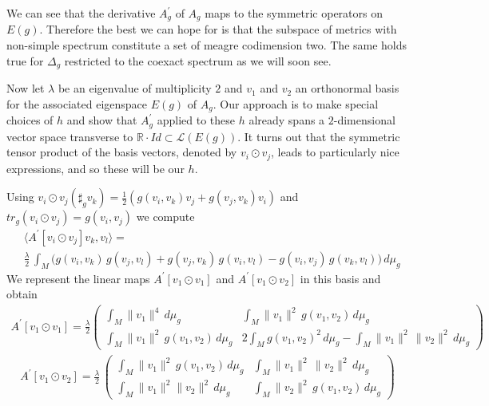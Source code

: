 \begin{rmk}
    We can see that the derivative $A^\prime_g$ of $A_g$ maps to the symmetric operators on $E(g)$. Therefore the best we can hope for is that the subspace of metrics with non-simple spectrum constitute a set of meagre codimension two. The same holds true for $\Delta_g$ restricted to the coexact spectrum as we will soon see.
\end{rmk}

Now let $\lambda$ be an eigenvalue of multiplicity $2$ and $v_1$ and $v_2$ an orthonormal basis for the associated eigenspace $E(g)$ of $A_g$. Our approach is to make special choices of $h$ and show that $A^\prime_g$ applied to these $h$ already spans a $2$-dimensional vector space transverse to $\mathbb{R}\cdot Id \subset \mathcal{L}(E(g))$. It turns out that the symmetric tensor product of the basis vectors, denoted by $v_i\odot v_j$, leads to particularly nice expressions, and so these will be our $h$.\par

Using $v_i\odot v_j(\sharp_g v_k)=\frac{1}{2}(g(v_i,v_k)v_j+g(v_j,v_k)v_i)$ and $tr_g(v_i\odot v_j)=g(v_i,v_j)$ we compute 
\begin{align*}
 &\langle A^{\prime}[v_i\odot v_j]v_k,v_l\rangle=\\
 &\frac{\lambda}{2}\,\int_M \bigg(g(v_i,v_k)\,g(v_j,v_l)+g(v_j,v_k)\,g(v_i,v_l)-g(v_i,v_j)\,g(v_k,v_l)\bigg)\,d\mu_g   
\end{align*}
We represent the linear maps $A^{\prime}[v_1\odot v_1]$ and $A^{\prime}[v_1\odot v_2]$ in this basis and obtain
\begin{align*}
 A^{\prime}[v_1\odot v_1]=  \frac{\lambda}{2} \begin{pmatrix}
        \int_M \lVert v_1\rVert^4\,d\mu_g &\int_M \lVert v_1\rVert^2\,g(v_1,v_2)\,d\mu_g\\
        \int_M \lVert v_1\rVert^2\,g(v_1,v_2)\,d\mu_g&2\int_M g(v_1,v_2)^2\,d\mu_g-\int_M \lVert v_1\rVert^2\,\lVert v_2\rVert^2\,d\mu_g
    \end{pmatrix}
\end{align*}
\begin{align*}
    A^{\prime}[v_1\odot v_2]=\frac{\lambda}{2}\,
\begin{pmatrix}
    \int_M \lVert v_1\rVert ^2\,g(v_1,v_2)\,d\mu_g & \int_M \lVert v_1\rVert^2 \,\lVert v_2\rVert^2\,d\mu_g \\
    \int_M \lVert v_1\rVert^2 \lVert v_2\rVert^2\,d\mu_g &\int_M \lVert v_2\rVert^2\,g(v_1,v_2)\,d\mu_g
\end{pmatrix}
\end{align*}

